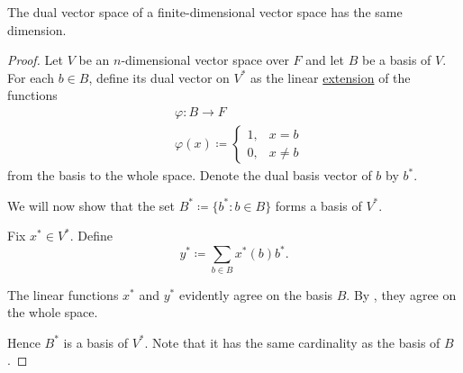 \begin{Proposition}\label{thm:finite_dimensional_dual_space_is_isomorphic}
  The dual vector space of a finite-dimensional vector space has the same dimension.
\end{Proposition}
\begin{proof}
  Let \( V \) be an \( n \)-dimensional vector space over \( F \) and let \( B \) be a basis of \( V \). For each \( b \in B \), define its dual vector on \( V^* \) as the linear \hyperref[thm:linear_map_iff_function_on_basis]{extension} of the functions
  \begin{align*}
    &\varphi: B \to F \\
    &\varphi(x) \coloneqq \begin{cases}
      1, &x = b \\
      0, &x \neq b
    \end{cases}
  \end{align*}
  from the basis to the whole space. Denote the dual basis vector of \( b \) by \( b^* \).

  We will now show that the set \( B^* \coloneqq \{ b^* \colon b \in B \} \) forms a basis of \( V^* \).

  Fix \( x^* \in V^* \). Define
  \begin{equation*}
    y^* \coloneqq \sum_{b \in B} x^*(b) b^*.
  \end{equation*}

  The linear functions \( x^* \) and \( y^* \) evidently agree on the basis \( B \). By , they agree on the whole space.

  Hence \( B^* \) is a basis of \( V^* \). Note that it has the same cardinality as the basis of \( B \).
\end{proof}

